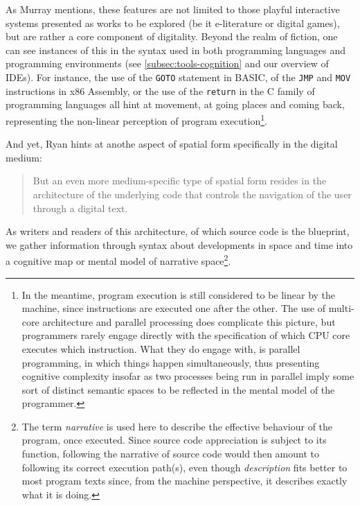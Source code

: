 As Murray mentions, these features are not limited to those playful interactive systems presented as works to be explored (be it e-literature or digital games), but are rather a core component of digitality. Beyond the realm of fiction, one can see instances of this in the syntax used in both programming languages and programming environments (see \autoref{subsec:tools-cognition} and our overview of IDEs). For instance, the use of the \lstinline{GOTO} statement in BASIC, of the \lstinline{JMP} and \lstinline{MOV} instructions in x86 Assembly, or the use of the \lstinline{return} in the C family of programming languages all hint at movement, at going places and coming back, representing the non-linear perception of program execution\footnote{In the meantime, program execution is still considered to be linear by the machine, since instructions are executed one after the other. The use of multi-core architecture and parallel processing does complicate this picture, but programmers rarely engage directly with the specification of which CPU core executes which instruction. What they do engage with, is parallel programming, in which things happen simultaneously, thus presenting cognitive complexity insofar as two processes being run in parallel imply some sort of distinct semantic spaces to be reflected in the mental model of the programmer.}.

And yet, Ryan hints at anothe aspect of spatial form specifically in the digital medium:

\begin{quote}
    But an even more medium-specific type of spatial form resides in the architecture of the underlying code that controls the navigation of the user through a digital text. \citep{ryan_four_2021}
\end{quote}

As writers and readers of this architecture, of which source code is the blueprint, we gather information through syntax about developments in space and time into a cognitive map or mental model of narrative space\footnote{The term \emph{narrative} is used here to describe the effective behaviour of the program, once executed. Since source code appreciation is subject to its function, following the narrative of source code would then amount to following its correct execution path(s), even though \emph{description} fits better to most program texts since, from the machine perspective, it describes exactly what it is doing.}.

